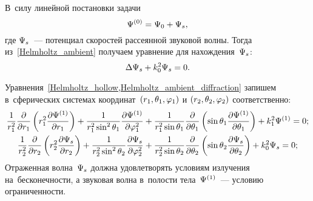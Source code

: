В~силу линейной постановки задачи 
\begin{equation} \label{potention_speed_ambient}
\P^{(0)} = \P_0 + \P_s,
\end{equation}
где $\P_s$~--- потенциал скоростей рассеянной звуковой волны. Тогда из~\eqref{Helmholtz_ambient} получаем уравнение для нахождения~$\P_s$:
\begin{equation} \label{Helmholtz_ambient_diffraction}
\Lap\P_s + k_0^2\P_s = 0.
\end{equation}

Уравнения~\cref{Helmholtz_hollow,Helmholtz_ambient_diffraction} запишем в~сферических системах координат~$(r_1, \Q_1, \f_1)$ и $(r_2, \Q_2, \f_2)$ соответственно:
\begin{align}
\fr1{r_1^2}\fr\de{\de r_1}\left(r_1^2 \fr{\de\P^{(1)}}{\de r_1}\right) + \fr1{r_1^2\sin^2\Q_1}\fr{\de\P^{(1)}}{\de\f_1^2} &+ \fr1{r_1^2\sin\Q_1}\fr\de{\de\Q_1} \left(\sin\Q_1 \fr{\de\P^{(1)}}{\de\Q_1}\right) + k_1^2\P^{(1)} = 0;\\
\fr1{r_2^2}\fr\de{\de r_2}\left(r_2^2 \fr{\de\P_s}{\de r_2}\right) + \fr1{r_2^2\sin^2\Q_2}\fr{\de\P_s}{\de\f_2^2} &+ \fr1{r_2^2\sin\Q_2}\fr\de{\de\Q_2} \left(\sin\Q_2 \fr{\de\P_s}{\de\Q_2}\right) + k_0^2\P_s = 0;
\end{align}
Отраженная волна~$\P_s$ должна удовлетворять условиям излучения на~бесконечности, а звуковая волна в~полости тела~$\P^{(1)}$~--- условию ограниченности.


